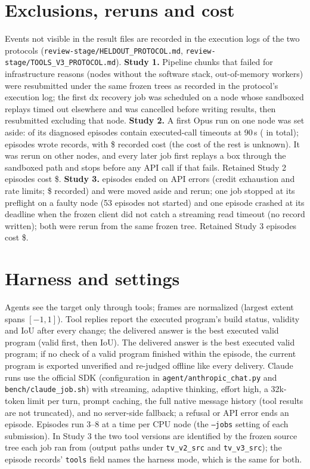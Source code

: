 \section{Exclusions, reruns and cost}
\label{app:log}
Events not visible in the result files are recorded in the execution logs of the two protocols (\texttt{review-stage/HELDOUT\_PROTOCOL.md}, \texttt{review-stage/TOOLS\_V3\_PROTOCOL.md}). \textbf{Study 1.} Pipeline chunks that failed for infrastructure reasons (nodes without the software stack, out-of-memory workers) were resubmitted under the same frozen trees as recorded in the protocol's execution log; the first dx recovery job was scheduled on a node whose sandboxed replays timed out elsewhere and was cancelled before writing results, then resubmitted excluding that node.
\textbf{Study 2.} A first Opus run on one node was set aside: \cDiscardedTimeoutEpisodes{} of its \cDiscardedDiagnosed{} diagnosed episodes contain executed-call timeouts at 90\,s (\cDiscardedTimeouts{} in total); \cDiscardedRecords{} episodes wrote records, with \$\cDiscardedCost{} recorded cost (the cost of the rest is unknown). It was rerun on other nodes, and every later job first replays a box through the sandboxed path and stops before any API call if that fails. Retained Study 2 episodes cost \$\cCostRetained.
\textbf{Study 3.} \tApiFailed{} episodes ended on API errors (credit exhaustion and rate limits; \$\tApiFailedCost{} recorded) and were moved aside and rerun; one job stopped at its preflight on a faulty node (53 episodes not started) and one episode crashed at its deadline when the frozen client did not catch a streaming read timeout (no record written); both were rerun from the same frozen tree. Retained Study 3 episodes cost \$\tCostTotal.

\section{Harness and settings}
\label{app:harness}
Agents see the target only through tools; frames are normalized (largest extent spans $[-1,1]$). Tool replies report the executed program's build status, validity and IoU after every change; the delivered answer is the best executed valid program (valid first, then IoU). The delivered answer is the best executed valid program; if no check of a valid program finished within the episode, the current program is exported unverified and re-judged offline like every delivery. Claude runs use the official SDK (configuration in \texttt{agent/anthropic\_chat.py} and \texttt{bench/claude\_job.sh}) with streaming, adaptive thinking, effort high, a 32k-token limit per turn, prompt caching, the full native message history (tool results are not truncated), and no server-side fallback; a refusal or API error ends an episode. Episodes run 3--8 at a time per CPU node (the \texttt{--jobs} setting of each submission). In Study 3 the two tool versions are identified by the frozen source tree each job ran from (output paths under \texttt{tv\_v2\_src} and \texttt{tv\_v3\_src}); the episode records' \texttt{tools} field names the harness mode, which is the same for both.

